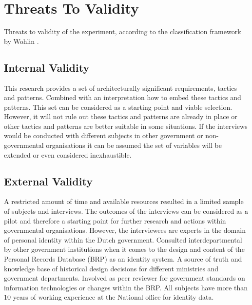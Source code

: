 \chapter{Threats To Validity}\label{sec:threats}
Threats to validity of the experiment, according to the classification framework by Wohlin \etal \cite{wohlin12}.

\section{Internal Validity}
This research provides a set of architecturally significant requirements, tactics and patterns. Combined with an interpretation how to embed these tactics and patterns.
This set can be considered as a starting point and viable selection. However, it will not rule out these tactics and patterns are already in place or other tactics and patterns are better suitable in some situations. If the interviews would be conducted with different subjects in other government or non-governmental organisations it can be assumed the set of variables will be extended or even considered inexhaustible.

\section{External Validity}
A restricted amount of time and available resources resulted in a limited sample of subjects and interviews. The outcomes of the interviews can be considered as a pilot and therefore a starting point for further research and actions within governmental organisations. However, the interviewees are experts in the domain of personal identity within the Dutch government. Consulted interdepartmental by other government institutions when it comes to the design and content of the Personal Records Database (BRP) as an identity system. A source of truth and knowledge base of historical design decisions for different ministries and government departments. Involved as peer reviewer for government standards on information technologies or changes within the BRP. All subjects have more than 10 years of working experience at the National office for identity data.  

